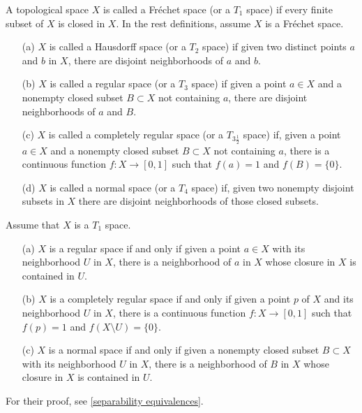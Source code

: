 \begin{defi}
    A topological space $X$ is called a Fr\'echet space (or a $T_1$ space) if every finite subset of $X$ is closed in $X$.
    In the rest definitions, assume $X$ is a Fr\'echet space.
    \begin{enumerate}
        \item[(a)]
        {
            $X$ is called a Hausdorff space (or a $T_2$ space) if given two distinct points $a$ and $b$ in $X$, there are disjoint neighborhoods of $a$ and $b$.
        }
        \item[(b)]
        {
            $X$ is called a regular space (or a $T_3$ space) if given a point $a\in X$ and a nonempty closed subset $B\subset X$ not containing $a$, there are disjoint neighborhoods of $a$ and $B$.
        }
        \item[(c)]
        {
            $X$ is called a completely regular space (or a $T_{3\frac{1}{2}}$ space) if, given a point $a\in X$ and a nonempty closed subset $B\subset X$ not containing $a$, there is a continuous function $f: X\rightarrow[0, 1]$ such that $f(a)=1$ and $f(B)=\{0\}$.
        }
        \item[(d)]
        {
            $X$ is called a normal space (or a $T_4$ space) if, given two nonempty disjoint subsets in $X$ there are disjoint neighborhoods of those closed subsets.
        }
    \end{enumerate}
\end{defi}
\begin{rmk}
    Assume that $X$ is a $T_1$ space.
    \begin{enumerate}
        \item[(a)]
        {
            $X$ is a regular space if and only if given a point $a\in X$ with its neighborhood $U$ in $X$, there is a neighborhood of $a$ in $X$ whose closure in $X$ is contained in $U$.
        }
        \item[(b)]
        {
            $X$ is a completely regular space if and only if given a point $p$ of $X$ and its neighborhood $U$ in $X$, there is a continuous function $f: X\rightarrow[0, 1]$ such that $f(p)=1$ and $f(X\setminus U)=\{0\}$.
        }
        \item[(c)]
        {
            $X$ is a normal space if and only if given a nonempty closed subset $B\subset X$ with its neighborhood $U$ in $X$, there is a neighborhood of $B$ in $X$ whose closure in $X$ is contained in $U$.
        }
    \end{enumerate}
    For their proof, see \cref{separability equivalences}.
\end{rmk}

